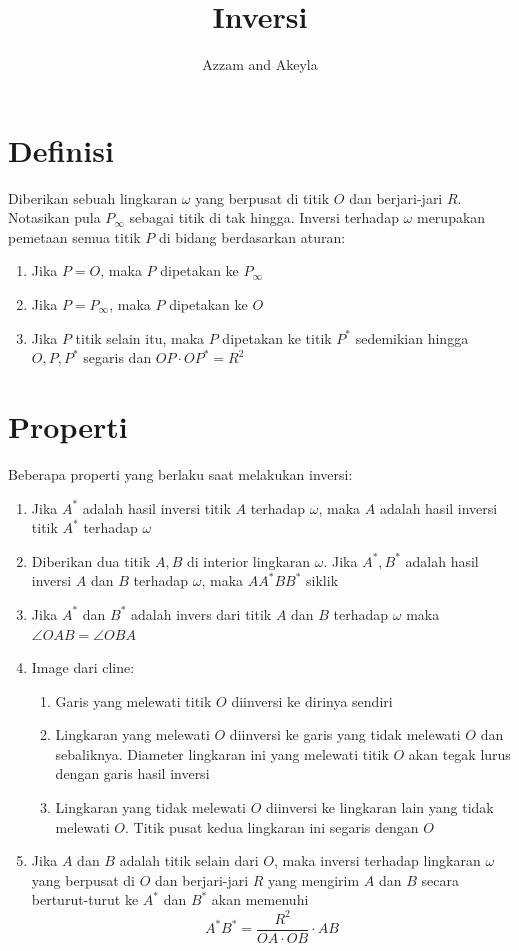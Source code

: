 \documentclass[11pt]{scrartcl}
\title{Inversi}
\author{Azzam and Akeyla}
\begin{document}
\maketitle

\renewcommand*\contentsname{Daftar Isi}
\tableofcontents

\newpage

\section{Definisi}
Diberikan sebuah lingkaran $\omega$ yang berpusat di titik $O$ dan berjari-jari $R$. Notasikan pula $P_{\infty}$ sebagai titik di tak hingga. Inversi terhadap $\omega$ merupakan pemetaan semua titik $P$ di bidang berdasarkan aturan:
\begin{enumerate}
    \item Jika $P = O$, maka $P$ dipetakan ke $P_{\infty}$
    \item Jika $P = P_{\infty}$, maka $P$ dipetakan ke $O$
    \item Jika $P$ titik selain itu, maka $P$ dipetakan ke titik $P^{*}$ sedemikian hingga $O, P, P^{*}$ segaris dan $OP\cdot OP^{*} = R^2$
\end{enumerate}

\section{Properti}
Beberapa properti yang berlaku saat melakukan inversi:
\begin{enumerate}
    \item Jika $A^{*}$ adalah hasil inversi titik $A$ terhadap $\omega$, maka $A$ adalah hasil inversi titik $A^{*}$ terhadap $\omega$
    \item Diberikan dua titik $A, B$ di interior lingkaran $\omega$. Jika $A^{*}, B^{*}$ adalah hasil inversi $A$ dan $B$ terhadap $\omega$, maka $AA^{*}BB^{*}$ siklik
    \item Jika $A^{*}$ dan $B^{*}$ adalah invers dari titik $A$ dan $B$ terhadap $\omega$ maka $\angle{OAB} = \angle{OBA}$
    \item Image dari cline:
    \begin{enumerate}
        \item Garis yang melewati titik $O$ diinversi ke dirinya sendiri
        \item Lingkaran yang melewati $O$ diinversi ke garis yang tidak melewati $O$ dan sebaliknya. Diameter lingkaran ini yang melewati titik $O$ akan tegak lurus dengan garis hasil inversi
        \item Lingkaran yang tidak melewati $O$ diinversi ke lingkaran lain yang tidak melewati $O$. Titik pusat kedua lingkaran ini segaris dengan $O$
    \end{enumerate}
    \item Jika $A$ dan $B$ adalah titik selain dari $O$, maka inversi terhadap lingkaran $\omega$ yang berpusat di $O$ dan berjari-jari $R$ yang mengirim $A$ dan $B$ secara berturut-turut ke $A^{*}$ dan $B^{*}$ akan memenuhi \[A^{*}B^{*} = \dfrac{R^2}{OA\cdot OB}\cdot AB\]
\end{enumerate}
\end{document}
